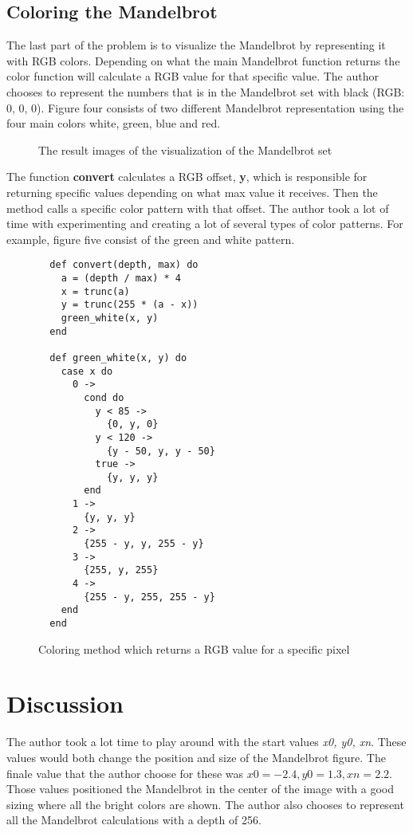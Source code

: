 \documentclass[a4paper,11pt]{article}
\begin{document}
\subsection*{Coloring the Mandelbrot}
The last part of the problem is to visualize the Mandelbrot by representing it with RGB colors. Depending on what the main Mandelbrot function returns the color function will calculate a RGB value for that specific value. The author chooses to represent the numbers that is in the Mandelbrot set with black (RGB: 0, 0, 0). Figure four consists of two different Mandelbrot representation using the four main colors white, green, blue and red.

\begin{figure}[H]
\centering
{}%
\qquad
{}%
\caption{The result images of the visualization of the Mandelbrot set}
\label{Figure:4}
\end{figure}

The function \textbf{convert} calculates a RGB offset, \textbf{y}, which is responsible for returning specific values depending on what max value it receives. Then the method calls a specific color pattern with that offset. The author took a lot of time with experimenting and creating a lot of several types of color patterns. For example, figure five consist of the green and white pattern.

\begin{figure}[H]
\begin{verbatim}
  def convert(depth, max) do
    a = (depth / max) * 4
    x = trunc(a)
    y = trunc(255 * (a - x))
    green_white(x, y)
  end
  
  def green_white(x, y) do
    case x do
      0 ->
        cond do
          y < 85 ->
            {0, y, 0}
          y < 120 ->
            {y - 50, y, y - 50}
          true ->
            {y, y, y}
        end
      1 ->
        {y, y, y}
      2 ->
        {255 - y, y, 255 - y}
      3 ->
        {255, y, 255}
      4 ->
        {255 - y, 255, 255 - y}
    end
  end
\end{verbatim}
\caption{Coloring method which returns a RGB value for a specific pixel}
\label{Figure:5}
\end{figure}

\section*{Discussion}
The author took a lot time to play around with the start values \textit{x0, y0, xn}. These values would both change the position and size of the Mandelbrot figure. The finale value that the author choose for these was $ x0 = -2.4, y0 = 1.3, xn = 2.2 $. Those values positioned the Mandelbrot in the center of the image with a good sizing where all the bright colors are shown. The author also chooses to represent all the Mandelbrot calculations with a depth of 256.
\end{document}
